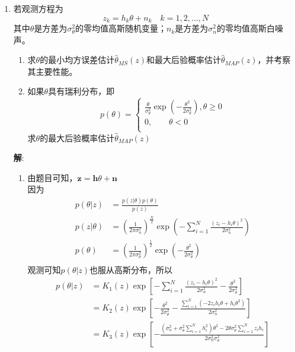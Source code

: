 \documentclass{article}
\begin{document}
\begin{enumerate}[1.]
\item
若观测方程为$$z_k=h_k\theta + n_k \quad k=1,2,...,N$$其中$\theta$是方差为$\sigma_{\theta}^2$的零均值高斯随机变量；$n_k$是方差为$\sigma_{n}^2$的零均值高斯白噪声。
\begin{enumerate}[(1)]
\item
求$\theta$的最小均方误差估计$\hat\theta_{MS}(z)$和最大后验概率估计$\hat\theta_{MAP}(z)$，并考察其主要性能。
\item
如果$\theta$具有瑞利分布，即
\[p(\theta )=\left\{ \begin{matrix}
   \frac{\theta }{\sigma _{\theta }^{2}}\exp \left( -\frac{{{\theta }^{2}}}{2\sigma _{\theta }^{2}} \right),\theta \ge 0  \\
   0,\qquad\theta <0  \\
\end{matrix} \right.\]
求$\theta$的最大后验概率估计$\hat\theta_{MAP}(z)$
\end{enumerate}
\textbf{解}:\\
\begin{enumerate}[(1)]
\item
由题目可知，$\bm{z}=\bm{h}\theta+\bm{n}$\\
因为\\
$$
\begin{aligned}
  p(\theta |z)&=\frac{p(z|\theta )p(\theta )}{p(z)} \\ 
 p(z|\theta )&={{\left( \frac{1}{2\pi \sigma _{n}^{2}} \right)}^{\frac{N}{2}}}\exp \left( -\sum\limits_{i=1}^{N}{\frac{{{({{z}_{i}}-{{h}_{i}}\theta )}^{2}}}{2\sigma _{n}^{2}}} \right) \\ 
 p(\theta )&={{\left( \frac{1}{2\pi \sigma _{\theta }^{2}} \right)}^{\frac{1}{2}}}\exp \left( -\frac{{{\theta }^{2}}}{2\sigma _{\theta }^{2}} \right) \\ 
\end{aligned}
$$
观测可知$p(\theta|z)$也服从高斯分布，所以\\
\[\begin{aligned}
 p(\theta |z)
 & ={{K}_{1}}(z)\exp \left[ -\sum\limits_{i=1}^{N}{\frac{{{({{z}_{i}}-{{h}_{i}}\theta )}^{2}}}{2\sigma _{n}^{2}}}-\frac{{{\theta }^{2}}}{2\sigma _{\theta }^{2}} \right] \\ 
 & ={{K}_{2}}(z)\exp \left[ -\frac{{{\theta }^{2}}}{2\sigma _{\theta }^{2}}-\frac{\sum\limits_{i=1}^{N}{(-2{{z}_{i}}{{h}_{i}}\theta +{{h}_{i}}{{\theta }^{2}})}}{2\sigma _{n}^{2}} \right] \\ 
 & ={{K}_{3}}(z)\exp \left[ -\frac{\left( \sigma _{n}^{2}+\sigma _{\theta }^{2}\sum\limits_{i=1}^{N}{h_{i}^{2}} \right){{\theta }^{2}}-2\theta \sigma _{\theta }^{2}\sum\limits_{i=1}^{N}{{{z}_{i}}{{h}_{i}}}}{2\sigma _{n}^{2}\sigma _{\theta }^{2}} \right] \\ 

\end{aligned}\]
\end{enumerate}
\end{enumerate}
\end{document}
